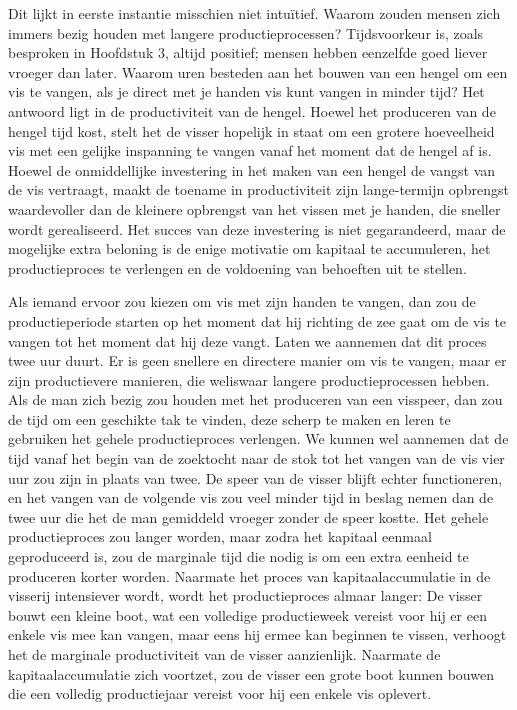 Dit lijkt in eerste instantie misschien niet intuïtief. Waarom zouden mensen zich immers bezig houden met langere productieprocessen? Tijdsvoorkeur is, zoals besproken in Hoofdstuk 3, altijd positief; mensen hebben eenzelfde goed liever vroeger dan later. Waarom uren besteden aan het bouwen van een hengel om een vis te vangen, als je direct met je handen vis kunt vangen in minder tijd? Het antwoord ligt in de productiviteit van de hengel. Hoewel het produceren van de hengel tijd kost, stelt het de visser hopelijk in staat om een grotere hoeveelheid vis met een gelijke inspanning te vangen vanaf het moment dat de hengel af is. Hoewel de onmiddellijke investering in het maken van een hengel de vangst van de vis vertraagt, maakt de toename in productiviteit zijn lange-termijn opbrengst waardevoller dan de kleinere opbrengst van het vissen met je handen, die sneller wordt gerealiseerd. Het succes van deze investering is niet gegarandeerd, maar de mogelijke extra beloning is de enige motivatie om kapitaal te accumuleren, het productieproces te verlengen en de voldoening van behoeften uit te stellen.\autocite{59a, 59b}

Als iemand ervoor zou kiezen om vis met zijn handen te vangen, dan zou de productieperiode starten op het moment dat hij richting de zee gaat om de vis te vangen tot het moment dat hij deze vangt. Laten we aannemen dat dit proces twee uur duurt. Er is geen snellere en directere manier om vis te vangen, maar er zijn productievere manieren, die weliswaar langere productieprocessen hebben. Als de man zich bezig zou houden met het produceren van een visspeer, dan zou de tijd om een geschikte tak te vinden, deze scherp te maken en leren te gebruiken het gehele productieproces verlengen. We kunnen wel aannemen dat de tijd vanaf het begin van de zoektocht naar de stok tot het vangen van de vis vier uur zou zijn in plaats van twee. De speer van de visser blijft echter functioneren, en het vangen van de volgende vis zou veel minder tijd in beslag nemen dan de twee uur die het de man gemiddeld vroeger zonder de speer kostte. Het gehele productieproces zou langer worden, maar zodra het kapitaal eenmaal geproduceerd is, zou de marginale tijd die nodig is om een extra eenheid te produceren korter worden. Naarmate het proces van kapitaalaccumulatie in de visserij intensiever wordt, wordt het productieproces almaar langer: De visser bouwt een kleine boot, wat een volledige productieweek vereist voor hij er een enkele vis mee kan vangen, maar eens hij ermee kan beginnen te vissen, verhoogt het de marginale productiviteit van de visser aanzienlijk. Naarmate de kapitaalaccumulatie zich voortzet, zou de visser een grote boot kunnen bouwen die een volledig productiejaar vereist voor hij een enkele vis oplevert.

